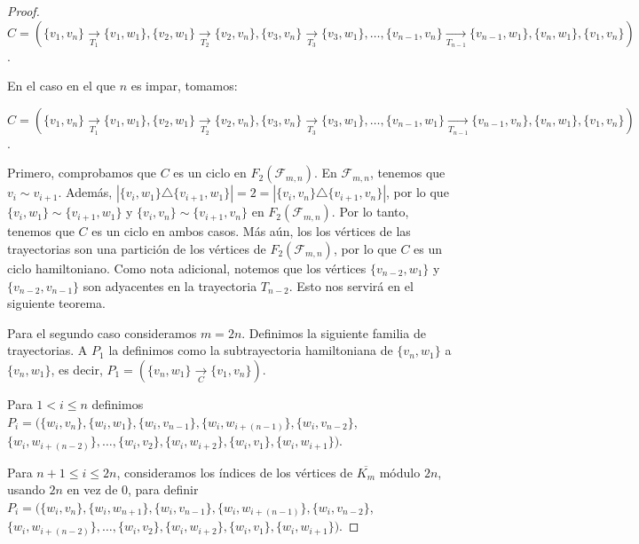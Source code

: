 \begin{proof}
    $C=(\{v_1,v_n\} \xrightarrow[T_1]{}\{v_1,w_1\},\{v_2,w_1\}
    \xrightarrow[T_2]{}\{v_2,v_n\},\{v_3,v_n\} \xrightarrow[T_3]{}\{v_3,w_1\},
    \dots, \{v_{n-1},v_n\}
    \xrightarrow[T_{n-1}]{}\{v_{n-1},w_1\},\{v_n,w_1\},\{v_1,v_n\})$.

    En el caso en el que $n$ es impar, tomamos:

    $C=(\{v_1,v_n\} \xrightarrow[T_1]{}\{v_1,w_1\},\{v_2,w_1\}
    \xrightarrow[T_2]{}\{v_2,v_n\},\{v_3,v_n\} \xrightarrow[T_3]{}\{v_3,w_1\},
    \dots, \{v_{n-1},w_1\}
    \xrightarrow[T_{n-1}]{}\{v_{n-1},v_n\},\{v_n,w_1\},\{v_1,v_n\})$.

    Primero, comprobamos que $C$ es un ciclo en $F_2(\mathcal{F}_{m,n})$. En
    $\mathcal{F}_{m,n}$, tenemos que $v_i \sim v_{i+1}$. Adem\'as,
    $|\{v_i,w_1\}\triangle \{v_{i+1},w_1\}|=2 =|\{v_i,v_n\}\triangle
    \{v_{i+1},v_n\}|$, por lo que $\{v_i,w_1\}\sim \{v_{i+1},w_1\}$ y
    $\{v_i,v_n\}\sim \{v_{i+1},v_n\}$ en $F_2(\mathcal{F}_{m,n})$. Por lo tanto,
    tenemos que $C$ es un ciclo en ambos casos. M\'as a\'un, los los v\'ertices
    de las trayectorias son una partici\'on de los v\'ertices de
    $F_2(\mathcal{F}_{m,n})$, por lo que $C$ es un ciclo hamiltoniano. Como nota
    adicional, notemos que los v\'ertices $\{v_{n-2},w_1\}$ y
    $\{v_{n-2},v_{n-1}\}$ son adyacentes en la trayectoria $T_{n-2}$. Esto nos
    servir\'a en el siguiente teorema.

    Para el segundo caso consideramos $m=2n$. Definimos la siguiente familia de
    trayectorias. A $P_1$ la definimos como la subtrayectoria hamiltoniana de
    $\{v_n,w_1\}$ a $\{v_n,w_1\}$, es decir, $P_1= (\{v_n,w_1\}
    \xrightarrow[C]{}\{v_1,v_n\})$. 
    
    Para $1 < i \leq n$ definimos
    $P_i=(\{w_i,v_n\},\{w_i,w_1\},\{w_i,v_{n-1}\},\{w_i,w_{i+(n-1)}\},\{w_i,v_{n-2}\}$,
    $\{w_i,w_{i+(n-2)}\},\dots,\{w_i,v_2\},\{w_i,w_{i+2}\},\{w_i,v_1\},\{w_i,w_{i+1}\})$.

    Para $n+1\leq i \leq 2n$, consideramos los \'indices de los v\'ertices de
    $\overline{K_m}$ m\'odulo $2n$, usando $2n$ en vez de $0$, para definir $P_i
    = (\{w_i,v_n\}, \{w_i,w_{n+1}\}, \{w_i,v_{n-1}\}, \{w_i,w_{i+(n-1)}\},
    \{w_i,v_{n-2}\}$, $\{w_i,w_{i+(n-2)}\}, \dots, \{w_i,v_2\}, \{w_i,w_{i+2}\},
    \{w_i,v_1\}, \{w_i,w_{i+1}\})$.


\end{proof}
